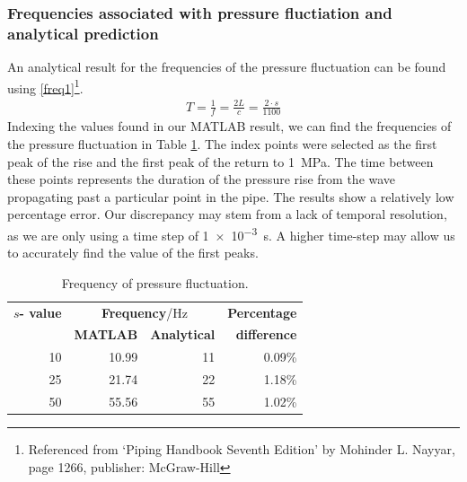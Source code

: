 \subsubsection{Frequencies associated with pressure fluctiation and analytical prediction}
An analytical result for the frequencies of the pressure fluctuation can be found using \eqref{freq1}\footnote{Referenced from `Piping Handbook Seventh Edition' by Mohinder L. Nayyar, page 1266, publisher: McGraw-Hill}.
\begin{gather}\label{freq1}
    T = \frac{1}{f} = \frac{2L}{c} = \frac{2\cdot s}{1100}
\end{gather}
Indexing the values found in our MATLAB result, we can find the frequencies of the pressure fluctuation in Table \ref{freq2}. The index points were selected as the first peak of the rise and the first peak of the return to \SI{1}{\mega\pascal}. The time between these points represents the duration of the pressure rise from the wave propagating past a particular point in the pipe. The results show a relatively low percentage error. Our discrepancy may stem from a lack of temporal resolution, as we are only using a time step of \SI{1e-3}{\second}. A higher time-step may allow us to accurately find the value of the first peaks.
\begin{table}[H]
    \centering
    \begin{tabular}{@{}rrrr@{}}
        \toprule
        \textbf{$s$- value} & \multicolumn{2}{c}{\textbf{Frequency}/\si{\hertz}} & \textbf{Percentage}                       \\
                            & \textbf{MATLAB}                                    & \textbf{Analytical} & \textbf{difference} \\
        \midrule
        10                  & 10.99                                              & 11                  & 0.09\%              \\
        25                  & 21.74                                              & 22                  & 1.18\%              \\
        50                  & 55.56                                              & 55                  & 1.02\%              \\
        \bottomrule
    \end{tabular}
    \caption{Frequency of pressure fluctuation.}
    \label{freq2}
\end{table}
